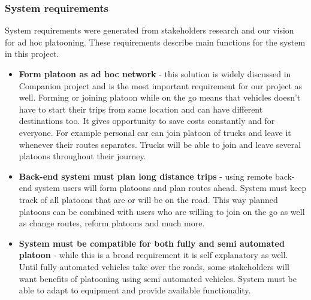 \subsubsection{System requirements}
%
System requirements were generated from stakeholders research and our vision for ad hoc platooning. These requirements describe main functions for the system in this project.
%
\begin{itemize}
    \item\textbf{Form platoon as ad hoc network} - this solution is widely discussed in Companion project and is the most important requirement for our project as well. Forming or joining platoon while on the go means that vehicles doesn't have to start their trips from same location and can have different destinations too. It gives opportunity to save costs constantly and for everyone. For example personal car can join platoon of trucks and leave it whenever their routes separates. Trucks will be able to join and leave several platoons throughout their journey.
    \item\textbf{Back-end system must plan long distance trips} - using remote back-end system users will form platoons and plan routes ahead. System must keep track of all platoons that are or will be on the road. This way planned platoons can be combined with users who are willing to join on the go as well as change routes, reform platoons and much more.
    \item\textbf{System must be compatible for both fully and semi automated platoon} - while this is a broad requirement it is self explanatory as well. Until fully automated vehicles take over the roads, some stakeholders will want benefits of platooning using semi automated vehicles. System must be able to adapt to equipment and provide available functionality.
\end{itemize}
%
